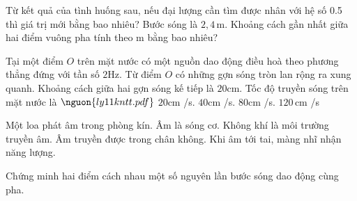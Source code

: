 \begin{ex}
Từ kết quả của tình huống sau, nếu đại lượng cần tìm được nhân với hệ số 0.5 thì giá trị mới bằng bao nhiêu? Bước sóng là $2,4\,\text{m}$. Khoảng cách gần nhất giữa hai điểm vuông pha tính theo m bằng bao nhiêu?
\end{ex}

\begin{ex}
Tại một điểm $O$ trên mặt nước có một nguồn dao động điều hoà theo phương thẳng đứng với tần số $2 \mathrm{Hz}$. Từ điểm $O$ có những gợn sóng tròn lan rộng ra xung quanh. Khoảng cách giữa hai gợn sóng kế tiếp là $20 \mathrm{cm}$. Tốc độ truyền sóng trên mặt nước là $\nguon{ly11 kntt.pdf}$
\choice
{$20 \mathrm{cm}$ /s.}
{\True $40 \mathrm{cm}$ /s.}
{$80 \mathrm{cm}$ /s.}
{$120\,\text{cm}$ /s}
\end{ex}

\begin{ex}
Một loa phát âm trong phòng kín.
\choiceTF
{\True Âm là sóng cơ.}
{\True Không khí là môi trường truyền âm.}
{Âm truyền được trong chân không.}
{\True Khi âm tới tai, màng nhĩ nhận năng lượng.}
\end{ex}

\begin{ex}
Chứng minh hai điểm cách nhau một số nguyên lần bước sóng dao động cùng pha.
\choiceTF

\end{ex}

